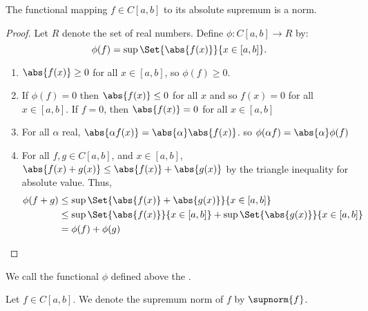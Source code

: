 \begin{prop}
The functional mapping $f \in C[a, b]$
to its absolute supremum is a norm.
\begin{proof}
Let $R$ denote the set of real numbers.
Define $\phi: C[a, b] \to R$ by:
\[
  \phi(f) = \sup \Set{\abs{f(x)}}{x \in [a, b]}.
\]
\begin{enumerate}
  \item
  $\abs{f(x)} \geq 0$ for all $x \in [a, b]$,
  so $\phi(f) \geq 0$.

  \item
  If $\phi(f) = 0$ then $\abs{f(x)} \leq 0$
    for all $x$ and so $f(x) = 0$ for all $x \in [a, b]$.
  If $f = 0$, then $\abs{f(x)} = 0$
  for all $x \in [a, b]$

  \item
  For all $\alpha$ real,
  $\abs{\alpha f(x)} = \abs{\alpha}\abs{f(x)}$.
  so $\phi(\alpha f) = \abs{\alpha}\phi(f)$

  \item
  For all $f, g \in C[a, b]$,
  and $x \in [a, b]$,
  $\abs{f(x) + g(x)} \leq \abs{f(x)} + \abs{g(x)}$
  by the triangle inequality for absolute value.
  Thus,
  \[
    \begin{aligned}
    \phi(f + g)
      &\leq \sup \Set{\abs{f(x)} + \abs{g(x)}}{x \in [a, b]} \\
      &\leq \sup \Set{\abs{f(x)}}{x \in [a,b]} + \sup \Set{\abs{g(x)}}{x \in [a, b]} \\
      &= \phi(f) + \phi(g)
    \end{aligned}
  \]
\end{enumerate}
\end{proof}
\end{prop}

We call the functional $\phi$
defined above the
.

Let $f \in C[a, b]$.
We denote the supremum norm of $f$
by $\supnorm{f}$.
\strats
